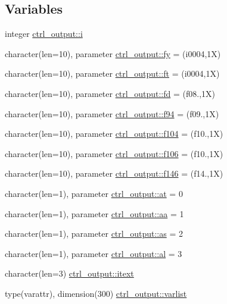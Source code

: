 \subsection*{Variables}
\begin{DoxyCompactItemize}
\item 
integer \hyperlink{namespacectrl__output_a0e436b9299ebba225dbe6a2f4eff2eed}{ctrl\+\_\+output\+::i}
\item 
character(len=10), parameter \hyperlink{namespacectrl__output_a250aeaca42269ac3898762523ec86e22}{ctrl\+\_\+output\+::fy} = \textquotesingle{}(i0004,1\+X)\textquotesingle{}
\item 
character(len=10), parameter \hyperlink{namespacectrl__output_a2b5a74f7a69e74fed45533d69b5fcf81}{ctrl\+\_\+output\+::ft} = \textquotesingle{}(i0004,1\+X)\textquotesingle{}
\item 
character(len=10), parameter \hyperlink{namespacectrl__output_aa27783daf4b75a43cae98a60ce884744}{ctrl\+\_\+output\+::fd} = \textquotesingle{}(f08.,1\+X)\textquotesingle{}
\item 
character(len=10), parameter \hyperlink{namespacectrl__output_a11f0b66275fc65047967ff8b2050ad25}{ctrl\+\_\+output\+::f94} = \textquotesingle{}(f09.,1\+X)\textquotesingle{}
\item 
character(len=10), parameter \hyperlink{namespacectrl__output_a8653fec4faca8b39551da13d93a3f223}{ctrl\+\_\+output\+::f104} = \textquotesingle{}(f10.,1\+X)\textquotesingle{}
\item 
character(len=10), parameter \hyperlink{namespacectrl__output_a191786067cffb2dc5dcfcafb12b2ead6}{ctrl\+\_\+output\+::f106} = \textquotesingle{}(f10.,1\+X)\textquotesingle{}
\item 
character(len=10), parameter \hyperlink{namespacectrl__output_a524b25246e690cfbc8f75fe72938fb06}{ctrl\+\_\+output\+::f146} = \textquotesingle{}(f14.,1\+X)\textquotesingle{}
\item 
character(len=1), parameter \hyperlink{namespacectrl__output_a18321fc13d7efb9b006ac70cece45909}{ctrl\+\_\+output\+::at} = \textquotesingle{}0\textquotesingle{}
\item 
character(len=1), parameter \hyperlink{namespacectrl__output_a51a0e846694f677a954a439b2d0069ce}{ctrl\+\_\+output\+::aa} = \textquotesingle{}1\textquotesingle{}
\item 
character(len=1), parameter \hyperlink{namespacectrl__output_a27bc52c96e692d0dbe7f6f73a3aea7e7}{ctrl\+\_\+output\+::as} = \textquotesingle{}2\textquotesingle{}
\item 
character(len=1), parameter \hyperlink{namespacectrl__output_a0cab13c6b1b664657d53f54bcaaf0b93}{ctrl\+\_\+output\+::al} = \textquotesingle{}3\textquotesingle{}
\item 
character(len=3) \hyperlink{namespacectrl__output_a4c25bfab41d6433c78b76c0a0d9c03b8}{ctrl\+\_\+output\+::itext}
\item 
type(varattr), dimension(300) \hyperlink{namespacectrl__output_abf54926f3da30aea81f0d2ddfc9f4649}{ctrl\+\_\+output\+::varlist}
\end{DoxyCompactItemize}
